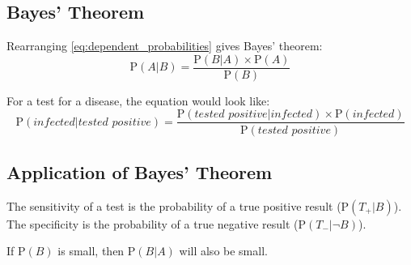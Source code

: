 \subsection{Bayes' Theorem}
Rearranging \cref{eq:dependent_probabilities} gives Bayes' theorem:
\begin{equation}
    \mathrm{P}(A|B) = \frac{\mathrm{P}(B|A) \times \mathrm{P}(A)}{\mathrm{P}(B)}
    \label{eq:bayes_theorem}
\end{equation}
\begin{example}
    For a test for a disease, the equation would look like:
    \begin{equation*}
        \mathrm{P}(infected|\textit{tested positive}) = \frac{\mathrm{P}(\textit{tested positive}|infected) \times \mathrm{P}(infected)}{\mathrm{P}(\textit{tested positive})}
    \end{equation*}
\end{example}

\subsection{Application of Bayes' Theorem}
The sensitivity of a test is the probability of a true positive result (\(\mathrm{P}(T_+|B)\)). The specificity is the probability of a true negative result (\(\mathrm{P}(T_- | \neg B)\)).

If \(\mathrm{P}(B)\) is small, then \(\mathrm{P}(B|A)\) will also be small.
